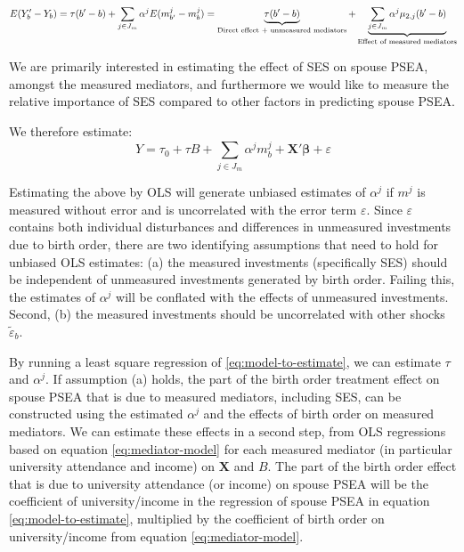\documentclass[
]{article}
\theoremstyle{definition}
\theoremstyle{definition}
\theoremstyle{definition}
\theoremstyle{definition}
\theoremstyle{remark}
\begin{document}
\begin{equation}
\label{eq:decomposition}
E(Y_b' - Y_b) = \tau(b' - b) + \sum_{j \in J_m} \alpha^j E(m^j_{b'} - m^j_b) \\
=\underbrace{\tau(b' - b)}_{\text{Direct effect + unmeasured mediators}} + \underbrace{\sum_{j \in J_m} \alpha^j \mu_{2,j} (b' - b)}_{\text{Effect of measured mediators}}
\end{equation}

We are primarily interested in estimating the effect of SES on spouse PSEA,
amongst the measured mediators, and furthermore we would like to measure the
relative importance of SES compared to other factors in predicting spouse PSEA.

We therefore estimate:
\begin{equation}
\label{eq:model-to-estimate}
Y = \tau_0 + \tau B + \sum_{j \in J_m} \alpha^j m^j_b + \mathbf{X'} \symbf{\beta} + \varepsilon
\end{equation}

Estimating the above by OLS will generate unbiased estimates of
\(\alpha^j\) if \(m^j\) is measured without error and is
uncorrelated with the error term \(\varepsilon\). Since
\(\varepsilon\) contains both individual disturbances and differences
in unmeasured investments due to birth order, there are two identifying assumptions that need to hold for unbiased OLS estimates: (a) the measured investments
(specifically SES) should be independent of unmeasured investments
generated by birth order. Failing this, the estimates of \(\alpha^j\) will be
conflated with the effects of unmeasured investments. Second, (b) the measured
investments should be uncorrelated with other shocks \(\tilde{\varepsilon}_b\).

By running a least square regression of \eqref{eq:model-to-estimate}, we can
estimate \(\tau\) and \(\alpha^j\). If assumption (a) holds, the part of the birth
order treatment effect on spouse PSEA that is due to measured mediators,
including SES, can be constructed using the estimated \(\alpha^j\) and the effects
of birth order on measured mediators. We can estimate these effects in a second
step, from OLS regressions based on equation \eqref{eq:mediator-model} for each
measured mediator (in particular university attendance and income) on
\(\mathbf{X}\) and \(B\). The part of the birth order effect that is due to
university attendance (or income) on spouse PSEA will be the coefficient of
university/income in the regression of spouse PSEA in equation
\eqref{eq:model-to-estimate}, multiplied by the coefficient of birth order on
university/income from equation \eqref{eq:mediator-model}.
\end{document}
